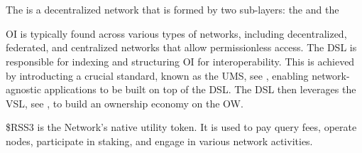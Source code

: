 \section{}

The  is a decentralized network that is formed by two sub-layers: the  and the 

\gls{OI} is typically found across various types of networks, including decentralized, federated, and centralized networks that allow permissionless access.
The \gls{DSL} is responsible for indexing and structuring \gls{OI} for interoperability. 
This is achieved by introducting a crucial standard, known as the \gls{UMS}, see , enabling network-agnostic applications to be built on top of the \gls{DSL}.
The \gls{DSL} then leverages the \gls{VSL}, see , to build an ownership economy on the \gls{OW}.

\$RSS3 is the Network's native utility token. It is used to pay query fees, operate nodes, participate in staking, and engage in various network activities.